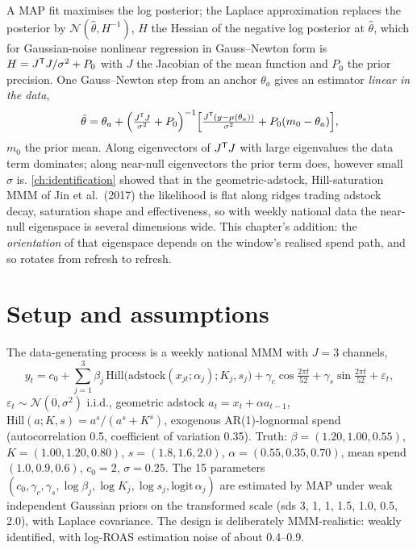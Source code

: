A MAP fit maximises the log posterior; the Laplace approximation replaces the posterior by $\mathcal N(\hat\theta, H^{-1})$, $H$ the Hessian of the negative log posterior at $\hat\theta$, which for Gaussian-noise nonlinear regression in Gauss--Newton form is $H = J^{\mathsf{T}} J/\sigma^2 + P_0$ with $J$ the Jacobian of the mean function and $P_0$ the prior precision. One Gauss--Newton step from an anchor $\theta_a$ gives an estimator \emph{linear in the data},
\begin{equation}
\hat\theta = \theta_a + \Big(\tfrac{J^{\mathsf{T}} J}{\sigma^2} + P_0\Big)^{-1}\Big[\tfrac{J^{\mathsf{T}}(y - \mu(\theta_a))}{\sigma^2} + P_0(m_0 - \theta_a)\Big],
\label{eq:refresh:gn}
\end{equation}
$m_0$ the prior mean. Along eigenvectors of $J^{\mathsf{T}} J$ with large eigenvalues the data term dominates; along near-null eigenvectors the prior term does, however small $\sigma$ is. \cref{ch:identification} showed that in the geometric-adstock, Hill-saturation MMM of Jin et al.\ (2017) the likelihood is flat along ridges trading adstock decay, saturation shape and effectiveness, so with weekly national data the near-null eigenspace is several dimensions wide. This chapter's addition: the \emph{orientation} of that eigenspace depends on the window's realised spend path, and so rotates from refresh to refresh.

\section{Setup and assumptions}

The data-generating process is a weekly national MMM with $J = 3$ channels,
\begin{equation}
y_t = c_0 + \sum_{j=1}^{3}\beta_j\,\mathrm{Hill}\big(\mathrm{adstock}(x_{jt}; \alpha_j); K_j, s_j\big) + \gamma_c\cos\tfrac{2\pi t}{52} + \gamma_s\sin\tfrac{2\pi t}{52} + \varepsilon_t,
\label{eq:refresh:dgp}
\end{equation}
$\varepsilon_t \sim \mathcal N(0, \sigma^2)$ i.i.d., geometric adstock $a_t = x_t + \alpha a_{t-1}$, $\mathrm{Hill}(a; K, s) = a^s/(a^s + K^s)$, exogenous AR(1)-lognormal spend (autocorrelation 0.5, coefficient of variation 0.35). Truth: $\beta = (1.20, 1.00, 0.55)$, $K = (1.00, 1.20, 0.80)$, $s = (1.8, 1.6, 2.0)$, $\alpha = (0.55, 0.35, 0.70)$, mean spend $(1.0, 0.9, 0.6)$, $c_0 = 2$, $\sigma = 0.25$. The 15 parameters $(c_0, \gamma_c, \gamma_s, \log\beta_j, \log K_j, \log s_j, \mathrm{logit}\,\alpha_j)$ are estimated by MAP under weak independent Gaussian priors on the transformed scale (sds 3, 1, 1, 1.5, 1.0, 0.5, 2.0), with Laplace covariance. The design is deliberately MMM-realistic: weakly identified, with log-ROAS estimation noise of about 0.4--0.9.

